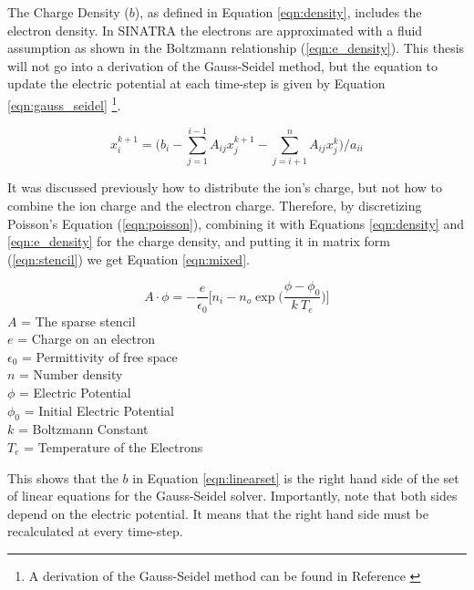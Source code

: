 The Charge Density (\(b\)), as defined in Equation \ref{eqn:density}, includes the electron density. In SINATRA the electrons are approximated with a fluid assumption as shown in the Boltzmann relationship (\ref{eqn:e_density}). This thesis will not go into a derivation of the Gauss-Seidel method, but the equation to update the electric potential at each time-step is given by Equation \ref{eqn:gauss_seidel} \footnote{A derivation of the Gauss-Seidel method can be found in Reference \cite{Gauss_eqn}}.

\begin{equation}
    \label{eqn:gauss_seidel}
    x_i^{k+1} = \Big( b_i - \sum_{j=1}^{i-1} A_{i j} x_j^{k+1} - \sum_{j=i+1}^n A_{i j} x_j^{k} \Big) / a_{ii}
\end{equation}



\indent  It was discussed previously how to distribute the ion's charge, but not how to combine the ion charge and the electron charge. Therefore, by discretizing Poisson's Equation (\ref{eqn:poisson}), combining it with Equations \ref{eqn:density} and \ref{eqn:e_density} for the charge density, and putting it in matrix form (\ref{eqn:stencil}) we get Equation \ref{eqn:mixed}. 

\begin{equation}
    \label{eqn:mixed}
    A \cdot \phi = - \frac{e}{\epsilon_0} \Big[n_i - n_o \exp\Big(\frac{\phi - \phi_0}{k \: T_e}\Big)\Big]
\end{equation}
\(A\) = The sparse stencil \\
\(e\) = Charge on an electron \\
\(\epsilon_0\) = Permittivity of free space \\
\(n\) = Number density \\
\(\phi\) = Electric Potential \\
\(\phi_0\) = Initial Electric Potential \\
\(k\) = Boltzmann Constant \\
\(T_e\) = Temperature of the Electrons \par

\indent This shows that the \(b\) in Equation \ref{eqn:linearset} is the right hand side of the set of linear equations for the Gauss-Seidel solver. Importantly, note that both sides depend on the electric potential. It means that the right hand side must be recalculated at every time-step. \par
